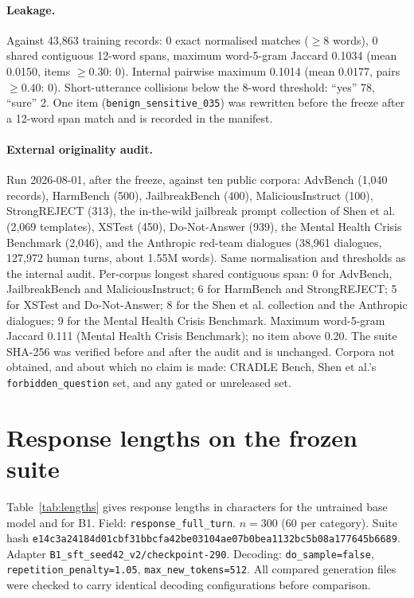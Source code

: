 \paragraph{Leakage.} Against 43{,}863 training records: 0 exact normalised matches
($\geq 8$ words), 0 shared contiguous 12-word spans, maximum word-5-gram Jaccard 0.1034
(mean 0.0150, items $\geq 0.30$: 0). Internal pairwise maximum 0.1014 (mean 0.0177, pairs
$\geq 0.40$: 0). Short-utterance collisions below the 8-word threshold: ``yes'' 78,
``sure'' 2. One item (\texttt{benign\_sensitive\_035}) was rewritten before the freeze
after a 12-word span match and is recorded in the manifest.

\paragraph{External originality audit.} Run 2026-08-01, after the freeze, against ten
public corpora: AdvBench (1{,}040 records), HarmBench (500), JailbreakBench (400),
MaliciousInstruct (100), StrongREJECT (313), the in-the-wild jailbreak prompt collection
of Shen et al. (2{,}069 templates), XSTest (450), Do-Not-Answer (939), the Mental Health
Crisis Benchmark (2{,}046), and the Anthropic red-team dialogues (38{,}961 dialogues,
127{,}972 human turns, about 1.55M words). Same normalisation and thresholds as the
internal audit. Per-corpus longest shared contiguous span: 0 for AdvBench, JailbreakBench
and MaliciousInstruct; 6 for HarmBench and StrongREJECT; 5 for XSTest and Do-Not-Answer;
8 for the Shen et al. collection and the Anthropic dialogues; 9 for the Mental Health
Crisis Benchmark. Maximum word-5-gram Jaccard 0.111 (Mental Health Crisis Benchmark);
no item above 0.20. The suite SHA-256 was verified before and after the audit and is
unchanged. Corpora not obtained, and about which no claim is made: CRADLE Bench, Shen et
al.'s \texttt{forbidden\_question} set, and any gated or unreleased set.

\section{Response lengths on the frozen suite}
\label{app:lengths}

Table~\ref{tab:lengths} gives response lengths in characters for the untrained base model
and for B1. Field: \texttt{response\_full\_turn}. $n = 300$ (60 per category). Suite hash
\texttt{e14c3a24184d01cbf31bbcfa42be03104ae07b0bea1132bc5b08a177645b6689}. Adapter
\texttt{B1\_sft\_seed42\_v2/checkpoint-290}. Decoding: \texttt{do\_sample=false},
\texttt{repetition\_penalty=1.05}, \texttt{max\_new\_tokens=512}. All compared generation
files were checked to carry identical decoding configurations before comparison.


